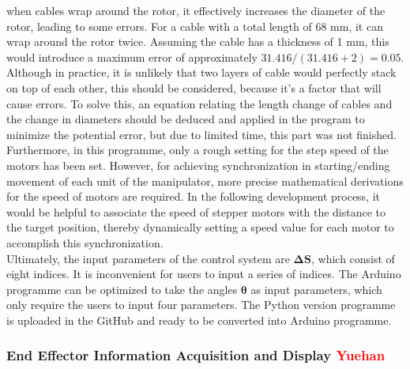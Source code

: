 when cables wrap around the rotor, it effectively increases the diameter of the rotor, leading to some errors. For a 
cable with a total length of 68 mm, it can wrap around the rotor twice. Assuming the cable has a thickness of 1 mm, this 
would introduce a maximum error of approximately $ 31.416 / (31.416 + 2) = 0.05 $. Although in practice, it is unlikely 
that two layers of cable would perfectly stack on top of each other, this should be considered, because it's a factor 
that will cause errors. To solve this, an equation relating the length change of cables and the change in diameters 
should be deduced and applied in the program to minimize the potential error, but due to limited time, this part was 
not finished.\\
Furthermore, in this programme, only a rough setting for the step speed of the motors has been set. However, for 
achieving synchronization in starting/ending movement of each unit of the manipulator, more precise mathematical 
derivations for the speed of motors are required. In the following development process, it would be helpful to 
associate the speed of stepper motors with the distance to the target position, thereby dynamically setting a 
speed value for each motor to accomplish this synchronization. \\
Ultimately, the input parameters of the control system are $\boldsymbol{\Delta S}$, which consist of eight indices. 
It is inconvenient for users to input a series of indices. The Arduino programme can be optimized to take the 
angles $\boldsymbol{\theta}$ as input parameters, which only require the users to input four parameters. The Python 
version programme is uploaded in the GitHub and ready to be converted into Arduino programme.\\
\subsubsection{End Effector Information Acquisition and Display \textcolor{red}{Yuehan}}


\newpage